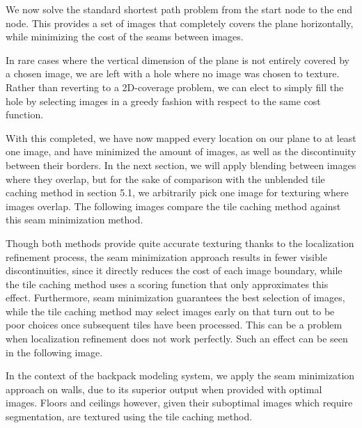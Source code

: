 \documentclass[10pt,twocolumn,letterpaper]{article}
\begin{document}
We now solve the standard shortest path problem from the start node to
the end node. This provides a set of images that completely covers the
plane horizontally, while minimizing the cost of the seams between
images.

In rare cases where the vertical dimension of the plane is not
entirely covered by a chosen image, we are left with a hole where no
image was chosen to texture. Rather than reverting to a 2D-coverage
problem, we can elect to simply fill the hole by selecting images in a
greedy fashion with respect to the same cost function.

With this completed, we have now mapped every location on our plane to
at least one image, and have minimized the amount of images, as well
as the discontinuity between their borders. In the next section, we
will apply blending between images where they overlap, but for the
sake of comparison with the unblended tile caching method in section
5.1, we arbitrarily pick one image for texturing where images
overlap. The following images compare the tile caching method against
this seam minimization method.



Though both methods provide quite accurate texturing thanks to the
localization refinement process, the seam minimization approach
results in fewer visible discontinuities, since it directly reduces
the cost of each image boundary, while the tile caching method uses a
scoring function that only approximates this effect. Furthermore, seam
minimization guarantees the best selection of images, while the tile
caching method may select images early on that turn out to be poor
choices once subsequent tiles have been processed. This can be a
problem when localization refinement does not work perfectly. Such an
effect can be seen in the following image.

In the context of the backpack modeling system, we apply the seam
minimization approach on walls, due to its superior output when
provided with optimal images. Floors and ceilings however, given their
suboptimal images which require segmentation, are textured using the
tile caching method.
\end{document}

